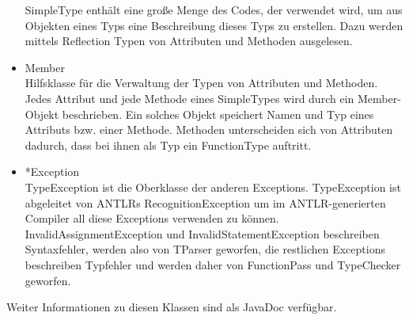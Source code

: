 \documentclass[10pt,a4paper,oneside]{scrbook}
\begin{document}
\begin{itemize}
    SimpleType enthält eine große Menge des Codes, der verwendet wird, um aus Objekten eines Typs eine Beschreibung dieses Typs zu erstellen. Dazu werden mittels Reflection Typen von Attributen und Methoden ausgelesen.
  \item Member\\
    Hilfsklasse für die Verwaltung der Typen von Attributen und Methoden. Jedes Attribut und jede Methode eines SimpleTypes wird durch ein Member-Objekt beschrieben. Ein solches Objekt speichert Namen und Typ eines Attributs bzw. einer Methode. Methoden unterscheiden sich von Attributen dadurch, dass bei ihnen als Typ ein FunctionType auftritt.
  \item *Exception\\
    TypeException ist die Oberklasse der anderen Exceptions. TypeException ist abgeleitet von ANTLRs RecognitionException um im ANTLR-generierten Compiler all diese Exceptions verwenden zu können.
    InvalidAssignmentException und InvalidStatementException beschreiben Syntaxfehler, werden also von TParser geworfen, die restlichen Exceptions beschreiben Typfehler und werden daher von FunctionPass und TypeChecker geworfen.
\end{itemize}

Weiter Informationen zu diesen Klassen sind als JavaDoc verfügbar.
\end{document}

